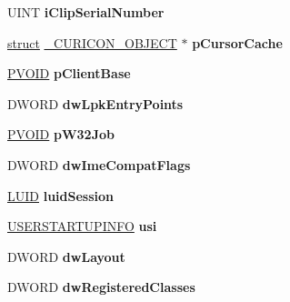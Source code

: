 \begin{DoxyCompactItemize}
U\+I\+NT {\bfseries i\+Clip\+Serial\+Number}
\item 
\mbox{\label{struct___p_r_o_c_e_s_s_i_n_f_o_a9dd3a1eee7b54e59c927a4f72f177ba1}} 
\hyperlink{interfacestruct}{struct} \hyperlink{struct___c_u_r_i_c_o_n___o_b_j_e_c_t}{\+\_\+\+C\+U\+R\+I\+C\+O\+N\+\_\+\+O\+B\+J\+E\+CT} $\ast$ {\bfseries p\+Cursor\+Cache}
\item 
\mbox{\label{struct___p_r_o_c_e_s_s_i_n_f_o_a1c2767d229c30c719d2956369e065921}} 
\hyperlink{interfacevoid}{P\+V\+O\+ID} {\bfseries p\+Client\+Base}
\item 
\mbox{\label{struct___p_r_o_c_e_s_s_i_n_f_o_aa8b08b0ef666fd0f286cd480e9bacd77}} 
D\+W\+O\+RD {\bfseries dw\+Lpk\+Entry\+Points}
\item 
\mbox{\label{struct___p_r_o_c_e_s_s_i_n_f_o_a0f093b2636039a3e42ab9a8f223d5b60}} 
\hyperlink{interfacevoid}{P\+V\+O\+ID} {\bfseries p\+W32\+Job}
\item 
\mbox{\label{struct___p_r_o_c_e_s_s_i_n_f_o_ab1ca878f91446b509faa002af9e535ef}} 
D\+W\+O\+RD {\bfseries dw\+Ime\+Compat\+Flags}
\item 
\mbox{\label{struct___p_r_o_c_e_s_s_i_n_f_o_a70f555e6a4f52f6255a4742b8bddd26a}} 
\hyperlink{struct___l_u_i_d}{L\+U\+ID} {\bfseries luid\+Session}
\item 
\mbox{\label{struct___p_r_o_c_e_s_s_i_n_f_o_a2cffa27fea61a9e00794e70246085fcb}} 
\hyperlink{structtag_u_s_e_r_s_t_a_r_t_u_p_i_n_f_o}{U\+S\+E\+R\+S\+T\+A\+R\+T\+U\+P\+I\+N\+FO} {\bfseries usi}
\item 
\mbox{\label{struct___p_r_o_c_e_s_s_i_n_f_o_ad9a0cfab9ef1e1f38c5650d892ac1047}} 
D\+W\+O\+RD {\bfseries dw\+Layout}
\item 
\mbox{\label{struct___p_r_o_c_e_s_s_i_n_f_o_a7bcb330b672189c267126ddcc8656b90}} 
D\+W\+O\+RD {\bfseries dw\+Registered\+Classes}
\item 

\end{DoxyCompactItemize}
